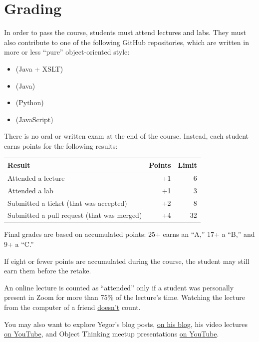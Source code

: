 \documentclass[nobrand,anonymous,nodate,nosecurity]{huawei}
\begin{document}
\newpage
\section*{Grading}

In order to pass the course, students must attend lectures and labs.
They must also contribute to one of the following GitHub repositories, which are written in more or less ``pure'' object-oriented style:

\begin{itemize}
    \item \href{https://github.com/objectionary/eo}{} (Java + XSLT)
    \item \href{https://github.com/yegor256/takes}{} (Java)
    \item \href{https://github.com/cqfn/aibolit}{} (Python)
    \item \href{https://github.com/objectionary/eoc}{} (JavaScript)
\end{itemize}

There is no oral or written exam at the end of the course.
Instead, each student earns points for the following results:

\renewcommand{\arraystretch}{1}
\begin{tabular}{lrr}
\toprule
Result & Points & Limit \\
\midrule
Attended a lecture & +1 & 6 \\
Attended a lab & +1 & 3 \\
Submitted a ticket (that was accepted) & +2 & 8 \\
Submitted a pull request (that was merged) & +4 & 32 \\
\bottomrule
\end{tabular}

Final grades are based on accumulated points: 25+ earns an ``A,'' 17+ a ``B,'' and 9+ a ``C.''

If eight or fewer points are accumulated during the course, the student may still earn them before the retake.

An online lecture is counted as ``attended'' only if a student was personally present in Zoom for more than 75\% of the lecture's time.
Watching the lecture from the computer of a friend \ul{doesn't} count.

\newpage
\renewcommand\refname{Learning Materials}
\printbibliography

You may also want to explore Yegor's blog posts, \href{https://www.yegor256.com/tag/oop}{on his blog}, his video lectures \href{https://www.youtube.com/playlist?list=PLaIsQH4uc08yw2CsNv5OV30GfKE6XVGii}{on YouTube}, and Object Thinking meetup presentations \href{https://www.youtube.com/watch?v=yT6oO28wEik&list=PLaIsQH4uc08yetzX86w1pPck1QtGEy_ik}{on YouTube}.
\end{document}
